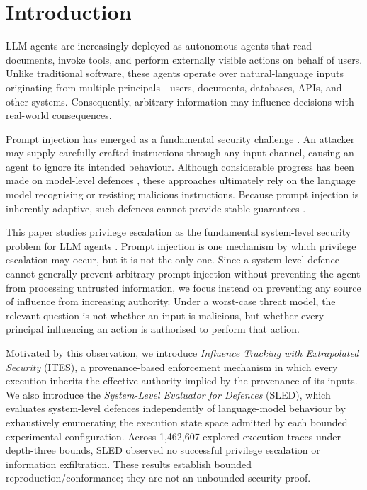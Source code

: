 \documentclass{article}
\begin{document}
\section{Introduction}
\label{sec:intro}

LLM agents are increasingly deployed as autonomous agents that read documents,
invoke tools, and perform externally visible actions on behalf of users. Unlike
traditional software, these agents operate over natural-language inputs
originating from multiple principals---users, documents, databases, APIs, and
other systems. Consequently, arbitrary information may influence decisions with
real-world consequences.

Prompt injection has emerged as a fundamental security challenge
\citep{rossi2024earlycategorizationpromptinjection}. An attacker may supply
carefully crafted instructions through any input channel, causing an agent to
ignore its intended behaviour. Although considerable progress has been made on
model-level defences
\citep{struq2024,spotlighting2024,chen2025defendingpromptinjectiondefensivetokens,chen2025secalign,liu2025datasentinel},
these approaches ultimately rely on the language model recognising or resisting
malicious instructions. Because prompt injection is inherently adaptive, such
defences cannot provide stable guarantees
\citep{pasquini2024neuralexec,choudhary2025detect,shao2025poisoning,yang2025checkpointgcg,jia2025criticalevaluation}.

This paper studies privilege escalation as the fundamental system-level
security problem for LLM agents \citep{provos2003preventing,davi2010privilege}.
Prompt injection is one mechanism by which privilege escalation may occur, but
it is not the only one. Since a system-level defence cannot generally prevent
arbitrary prompt injection without preventing the agent from processing
untrusted information, we focus instead on preventing any source of
influence from increasing authority. Under a worst-case threat model, the
relevant question is not whether an input is malicious, but whether every
principal influencing an action is authorised to perform that action.

Motivated by this observation, we introduce \emph{Influence Tracking with
Extrapolated Security} (ITES), a provenance-based enforcement mechanism in
which every execution inherits the effective authority implied by the
provenance of its inputs. We also introduce the \emph{System-Level Evaluator
for Defences} (SLED), which evaluates system-level defences independently of
language-model behaviour by exhaustively enumerating the execution state space
admitted by each bounded experimental configuration.
Across 1{,}462{,}607 explored execution traces under depth-three bounds,
SLED observed no successful
privilege escalation or information exfiltration. These results establish
bounded reproduction/conformance; they are not an unbounded security proof.
\end{document}
